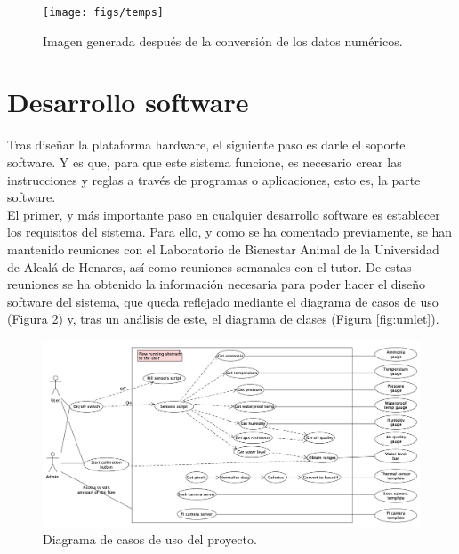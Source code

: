 \begin{figure} [h!]
  \begin{center}
    \texttt{[image: figs/temps]}
  \end{center}
  \caption{Imagen generada después de la conversión de los datos numéricos.}
  \label{fig:temps}
\end{figure}

\section{Desarrollo software}
\label{sec:dessw}
Tras diseñar la plataforma hardware, el siguiente paso es darle el soporte software. Y es que, para que este sistema funcione, es necesario crear las instrucciones y reglas a través de programas o aplicaciones, esto es, la parte software.\\

El primer, y más importante paso en cualquier desarrollo software es establecer los requisitos del sistema. Para ello, y como se ha comentado previamente, se han mantenido reuniones con el Laboratorio de Bienestar Animal de la Universidad de Alcalá de Henares, así como reuniones semanales con el tutor. De estas reuniones se ha obtenido la información necesaria para poder hacer el diseño software del sistema, que queda reflejado mediante el diagrama de casos de uso (Figura \ref{fig:casos}) y, tras un análisis de este, el diagrama de clases (Figura \ref{fig:umlet}).\\
\begin{figure} [h!]
  \begin{center}
    \includegraphics[width=17cm]{figs/casos}
  \end{center}
  \caption{Diagrama de casos de uso del proyecto.}
  \label{fig:casos}
\end{figure}

